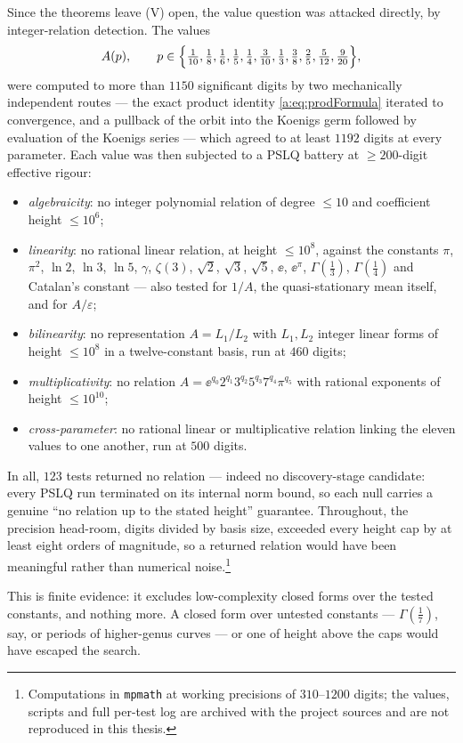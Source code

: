 Since the theorems leave (V) open, the value question was attacked directly, by
integer-relation detection. The values
\begin{equation}
\label{a:eq:pslqparams}
A(p),\qquad
p\in\Bigl\{\tfrac1{10},\tfrac18,\tfrac16,\tfrac15,\tfrac14,\tfrac3{10},
\tfrac13,\tfrac38,\tfrac25,\tfrac5{12},\tfrac9{20}\Bigr\},
\end{equation}
were computed to more than $1150$ significant digits by two mechanically
independent routes --- the exact product identity \cref{a:eq:prodFormula} iterated
to convergence, and a pullback of the orbit into the Koenigs germ followed by
evaluation of the Koenigs series --- which agreed to at least $1192$ digits at every
parameter. Each value was then subjected to a PSLQ battery at $\ge200$-digit
effective rigour:
\begin{itemize}[leftmargin=*]
\item \emph{algebraicity}: no integer polynomial relation of degree $\le10$ and
      coefficient height $\le10^{6}$;
\item \emph{linearity}: no rational linear relation, at height $\le10^{8}$, against
      the constants $\pi$, $\pi^{2}$, $\ln2$, $\ln3$, $\ln5$, $\gamma$, $\zeta(3)$,
      $\sqrt2$, $\sqrt3$, $\sqrt5$, $\ee$, $\ee^{\pi}$, $\Gamma(\tfrac13)$,
      $\Gamma(\tfrac14)$ and Catalan's constant --- also tested for $1/A$, the
      quasi-stationary mean itself, and for $A/\varepsilon$;
\item \emph{bilinearity}: no representation $A = L_1/L_2$ with $L_1,L_2$ integer
      linear forms of height $\le10^{8}$ in a twelve-constant basis, run at $460$
      digits;
\item \emph{multiplicativity}: no relation
      $A = \ee^{q_0}2^{q_1}3^{q_2}5^{q_3}7^{q_4}\pi^{q_5}$ with rational exponents
      of height $\le10^{10}$;
\item \emph{cross-parameter}: no rational linear or multiplicative relation linking
      the eleven values to one another, run at $500$ digits.
\end{itemize}
In all, $123$ tests returned no relation --- indeed no discovery-stage candidate:
every PSLQ run terminated on its internal norm bound, so each null carries a
genuine ``no relation up to the stated height'' guarantee. Throughout, the
precision head-room, digits divided by basis size, exceeded every height cap by at
least eight orders of magnitude, so a returned relation would have been meaningful
rather than numerical noise.\footnote{Computations in \texttt{mpmath} at working
precisions of $310$--$1200$ digits; the values, scripts and full per-test log are
archived with the project sources and are not reproduced in this thesis.}

This is finite evidence: it excludes
low-complexity closed forms over the tested constants, and nothing more. A closed
form over untested constants --- $\Gamma(\tfrac17)$, say, or periods of
higher-genus curves --- or one of height above the caps would have escaped the
search.

